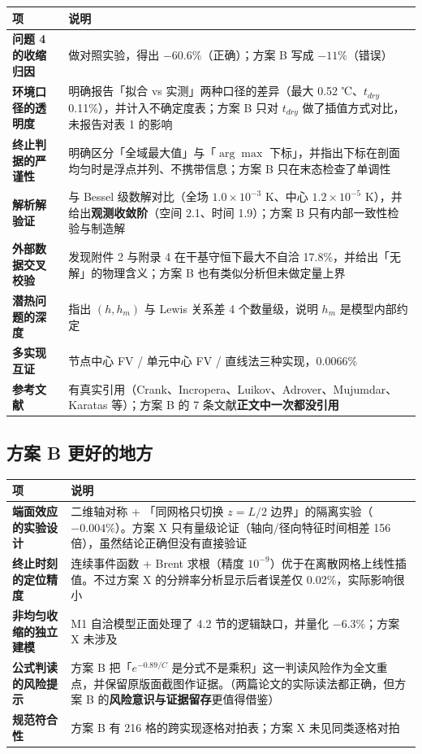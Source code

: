 \begin{center}
\small
\begin{tabular}{ll}
\toprule
项 & 说明 \\
\midrule
\textbf{问题 4 的收缩归因} & 做对照实验，得出 $-60.6\%$（正确）；方案 B 写成 $-11\%$（错误） \\
\textbf{环境口径的透明度} & 明确报告「拟合 vs 实测」两种口径的差异（最大 0.52 ℃、$t_{dry}$ 0.11\%），并计入不确定度表；方案 B 只对 $t_{dry}$ 做了插值方式对比，未报告对表 1 的影响 \\
\textbf{终止判据的严谨性} & 明确区分「全域最大值」与「$\arg\max$ 下标」，并指出下标在剖面均匀时是浮点并列、不携带信息；方案 B 只在末态检查了单调性 \\
\textbf{解析解验证} & 与 Bessel 级数解对比（全场 $1.0\times10^{-3}$ K、中心 $1.2\times10^{-5}$ K），并给出\textbf{观测收敛阶}（空间 2.1、时间 1.9）；方案 B 只有内部一致性检验与制造解 \\
\textbf{外部数据交叉校验} & 发现附件 2 与附录 4 在干基守恒下最大不自洽 17.8\%，并给出「无解」的物理含义；方案 B 也有类似分析但未做定量上界 \\
\textbf{潜热问题的深度} & 指出 $(h,h_m)$ 与 Lewis 关系差 4 个数量级，说明 $h_m$ 是模型内部约定 \\
\textbf{多实现互证} & 节点中心 FV / 单元中心 FV / 直线法三种实现，$0.0066\%$ \\
\textbf{参考文献} & 有真实引用（Crank、Incropera、Luikov、Adrover、Mujumdar、Karatas 等）；方案 B 的 7 条文献\textbf{正文中一次都没引用} \\
\bottomrule
\end{tabular}
\end{center}


\subsection{方案 B 更好的地方}


\begin{center}
\small
\begin{tabular}{ll}
\toprule
项 & 说明 \\
\midrule
\textbf{端面效应的实验设计} & 二维轴对称 + 「同网格只切换 $z=L/2$ 边界」的隔离实验（$-0.004\%$）。方案 X 只有量级论证（轴向/径向特征时间相差 156 倍），虽然结论正确但没有直接验证 \\
\textbf{终止时刻的定位精度} & 连续事件函数 + Brent 求根（精度 $10^{-9}$）优于在离散网格上线性插值。不过方案 X 的分辨率分析显示后者误差仅 0.02\%，实际影响很小 \\
\textbf{非均匀收缩的独立建模} & M1 自洽模型正面处理了 4.2 节的逻辑缺口，并量化 $-6.3\%$；方案 X 未涉及 \\
\textbf{公式判读的风险提示} & 方案 B 把「$e^{-0.89/C}$ 是分式不是乘积」这一判读风险作为全文重点，并保留原版面截图作证据。（两篇论文的实际读法都正确，但方案 B 的\textbf{风险意识与证据留存}更值得借鉴） \\
\textbf{规范符合性} & 方案 B 有 216 格的跨实现逐格对拍表；方案 X 未见同类逐格对拍 \\
\bottomrule
\end{tabular}
\end{center}


